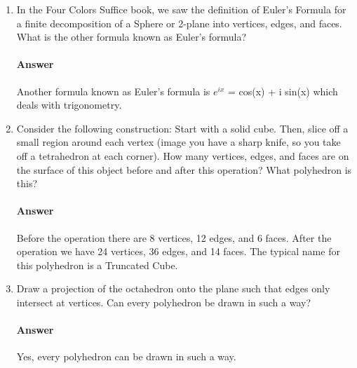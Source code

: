 \documentclass{article}
\begin{document}
\begin{enumerate}

    \item In the Four Colors Suffice book, we saw the definition of Euler's
        Formula for a finite decomposition of a Sphere or 2-plane into vertices,
        edges, and faces.  What is the other formula known as Euler's formula?

        \paragraph{Answer}

        {Another formula known as Euler's formula is $ e^{ix}$ = cos(x) + i sin(x) which deals with trigonometry.}

    \item  Consider the following construction: Start with a solid cube.  Then, slice
        off a small region around each vertex (image you have a sharp knife, so you take
        off a tetrahedron at each corner).  How many vertices, edges, and faces are on
        the surface of this object before and after this operation? What polyhedron is this?

        \paragraph{Answer}

        {Before the operation there are 8 vertices, 12 edges,  and 6 faces. After the operation we have  24 vertices, 36 edges, and 14 faces. The typical name for this polyhedron is a Truncated Cube. }


    \item Draw a projection of the octahedron onto the plane such that edges only
        intersect at vertices.  Can every polyhedron be drawn in such a way?

        \paragraph{Answer}

       {Yes, every polyhedron can be drawn in such a way.}


\end{enumerate}

\end{document}
